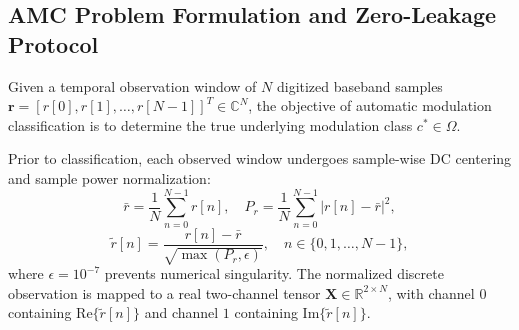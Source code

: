 \subsection{AMC Problem Formulation and Zero-Leakage Protocol}
\label{subsec:problem_formulation}

Given a temporal observation window of $N$ digitized baseband samples $\mathbf{r} = [r[0], r[1], \dots, r[N-1]]^T \in \mathbb{C}^N$, the objective of automatic modulation classification is to determine the true underlying modulation class $c^* \in \Omega$.

Prior to classification, each observed window undergoes sample-wise DC centering and sample power normalization:
\begin{equation}
\bar{r} = \frac{1}{N} \sum_{n=0}^{N-1} r[n], \quad P_r = \frac{1}{N} \sum_{n=0}^{N-1} |r[n] - \bar{r}|^2,
\label{eq:sample_norm_1}
\end{equation}
\begin{equation}
\tilde{r}[n] = \frac{r[n] - \bar{r}}{\sqrt{\max(P_r, \epsilon)}}, \quad n \in \{0, 1, \dots, N-1\},
\label{eq:sample_norm_2}
\end{equation}
where $\epsilon = 10^{-7}$ prevents numerical singularity. The normalized discrete observation is mapped to a real two-channel tensor $\mathbf{X} \in \mathbb{R}^{2 \times N}$, with channel $0$ containing $\text{Re}\{\tilde{r}[n]\}$ and channel $1$ containing $\text{Im}\{\tilde{r}[n]\}$.

